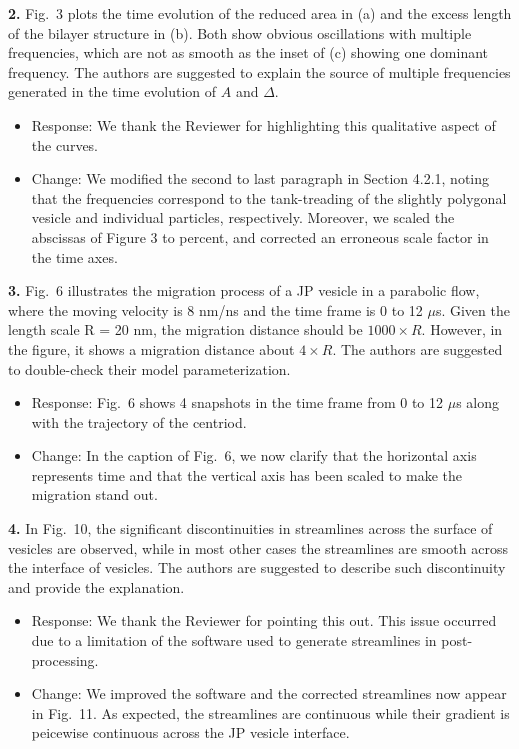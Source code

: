 \documentclass[11pt]{article}
\newcommand{\comment}[1]{{\color{blue} #1}}
\begin{document}
\noindent
\comment{{\bf 2.} Fig.~3 plots the time evolution of the reduced area in (a) and
the excess length of the bilayer structure in (b). Both show obvious
oscillations with multiple frequencies, which are not as smooth as the
inset of (c) showing one dominant frequency. The authors are suggested
to explain the source of multiple frequencies generated in the time
evolution of $A$ and $\Delta$.}
\begin{itemize}
\item Response: We thank the Reviewer for highlighting this qualitative aspect of
  the curves.

\item Change: We modified the second to last paragraph in Section 4.2.1,
 noting that the frequencies correspond to the tank-treading of the slightly
  polygonal vesicle and individual particles, respectively. 
  Moreover, we scaled the abscissas of Figure 3 to percent, and corrected
  an erroneous scale factor in the time axes. 
\end{itemize}

\noindent
\comment{{\bf 3.} Fig.~6 illustrates the migration process of a JP vesicle in a
parabolic flow, where the moving velocity is 8 nm/ns and the time frame
is 0 to 12 $\mu$s. Given the length scale R = 20 nm, the migration
distance should be $1000 \times R$. However, in the figure, it shows a
migration distance about $4 \times R$. The authors are suggested to
double-check their model parameterization.}
\begin{itemize}
\item Response: Fig.~6 shows 4 snapshots in the time frame from 0 to 12 $\mu$s along with the trajectory of the centriod.

  \item Change: In the caption of Fig.~6,  we now clarify that the horizontal axis 
    represents time and that the vertical axis has been scaled to make the
    migration stand out.
  
\end{itemize}

\noindent
\comment{{\bf 4.} In Fig.~10, the significant discontinuities in streamlines
across the surface of vesicles are observed, while in most other cases
the streamlines are smooth across the interface of vesicles. The authors
are suggested to describe such discontinuity and provide the
explanation.}
\begin{itemize}
\item Response: We thank the Reviewer for pointing this out.
  This issue occurred due to a limitation of the software used
  to generate streamlines in post-processing.

\item Change: We improved the software and the corrected streamlines now appear in Fig.~11.
  As expected, the streamlines are continuous while their gradient is peicewise continuous
  across the JP vesicle interface.
\end{itemize}
\end{document}
